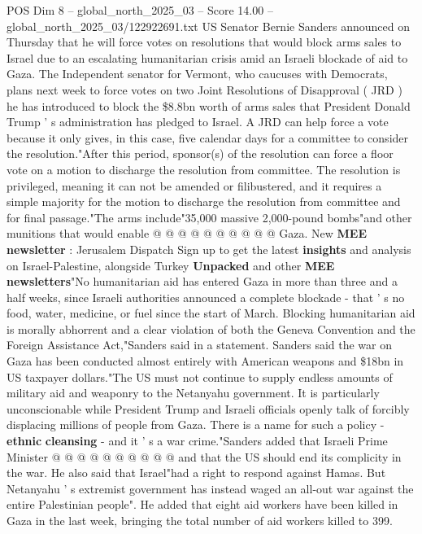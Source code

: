 \begin{textsample}{POS Dim 8 – global\_north\_2025\_03 – Score 14.00 – global\_north\_2025\_03/122922691.txt}  \label{ex:f8_pos_081}
US Senator Bernie Sanders announced on Thursday that he will force votes on resolutions that would block arms sales to Israel due to an escalating humanitarian crisis amid an Israeli blockade of aid to Gaza.
The Independent senator for Vermont, who caucuses with Democrats, plans next week to force votes on two Joint Resolutions of Disapproval ( JRD ) he has introduced to block the \$8.8bn worth of arms sales that President Donald Trump ' s administration has pledged to Israel.
A JRD can help force a vote because it only gives, in this case, five calendar days for a committee to consider the resolution."After this period, sponsor(s) of the resolution can force a floor vote on a motion to discharge the resolution from committee.
The resolution is privileged, meaning it can not be amended or filibustered, and it requires a simple majority for the motion to discharge the resolution from committee and for final passage."The arms include"35,000 massive 2,000-pound bombs"and other munitions that would enable @ @ @ @ @ @ @ @ @ @ Gaza.
New \textbf{MEE} \textbf{newsletter} : Jerusalem Dispatch Sign up to get the latest \textbf{insights} and analysis on Israel-Palestine, alongside Turkey \textbf{Unpacked} and other \textbf{MEE} \textbf{newsletters}"No humanitarian aid has entered Gaza in more than three and a half weeks, since Israeli authorities announced a complete blockade - that ' s no food, water, medicine, or fuel since the start of March.
Blocking humanitarian aid is morally abhorrent and a clear violation of both the Geneva Convention and the Foreign Assistance Act,"Sanders said in a statement.
Sanders said the war on Gaza has been conducted almost entirely with American weapons and \$18bn in US taxpayer dollars."The US must not continue to supply endless amounts of military aid and weaponry to the Netanyahu government.
It is particularly unconscionable while President Trump and Israeli officials openly talk of forcibly displacing millions of people from Gaza.
There is a name for such a policy - \textbf{ethnic} \textbf{cleansing} - and it ' s a war crime."Sanders added that Israeli Prime Minister @ @ @ @ @ @ @ @ @ @ and that the US should end its complicity in the war.
He also said that Israel"had a right to respond against Hamas.
But Netanyahu ' s extremist government has instead waged an all-out war against the entire Palestinian people".
He added that eight aid workers have been killed in Gaza in the last week, bringing the total number of aid workers killed to 399.

\end{textsample}
